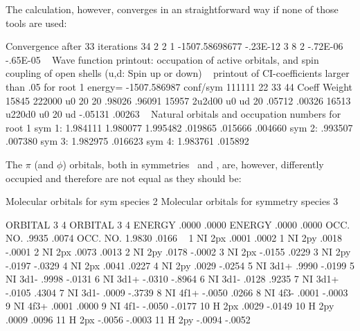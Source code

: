 The calculation, however, converges in an straightforward way if none of those tools are used:

\begin{sourcelisting}
      Convergence after  33 iterations
       34   2    2    1 -1507.58698677    -.23E-12   3   8 2  -.72E-06  -.65E-05  
~
                                  Wave function printout:
occupation of active orbitals, and spin coupling of open shells (u,d: Spin up or down)
~
      printout of CI-coefficients larger than   .05 for root   1
      energy=  -1507.586987
      conf/sym  111111 22 33 44     Coeff  Weight
         15845  222000 u0 20 20    .98026  .96091
         15957  2u2d00 u0 ud 20    .05712  .00326
         16513  u220d0 u0 20 ud   -.05131  .00263
~
      Natural orbitals and occupation numbers for root  1
      sym 1:   1.984111   1.980077   1.995482    .019865    .015666    .004660
      sym 2:    .993507    .007380
      sym 3:   1.982975    .016623
      sym 4:   1.983761    .015892
\end{sourcelisting}

The $\pi$ (and $\phi$) orbitals, both in symmetries \bo\ and \bt, are, however,
differently occupied and therefore are not equal as they should be:

\begin{sourcelisting}
   Molecular orbitals for sym species 2     Molecular orbitals for symmetry species 3

   ORBITAL        3         4               ORBITAL        3         4  
   ENERGY       .0000     .0000             ENERGY       .0000     .0000 
   OCC. NO.     .9935     .0074             OCC. NO.    1.9830     .0166
~
 1 NI  2px      .0001     .0002           1 NI  2py      .0018    -.0001 
 2 NI  2px      .0073     .0013           2 NI  2py      .0178    -.0002
 3 NI  2px     -.0155     .0229           3 NI  2py     -.0197    -.0329
 4 NI  2px      .0041     .0227           4 NI  2py      .0029    -.0254
 5 NI  3d1+     .9990    -.0199           5 NI  3d1-     .9998    -.0131
 6 NI  3d1+    -.0310    -.8964           6 NI  3d1-     .0128     .9235 
 7 NI  3d1+    -.0105     .4304           7 NI  3d1-     .0009    -.3739  
 8 NI  4f1+    -.0050     .0266           8 NI  4f3-     .0001    -.0003
 9 NI  4f3+     .0001     .0000           9 NI  4f1-    -.0050    -.0177
10 H   2px      .0029    -.0149          10 H   2py      .0009     .0096
11 H   2px     -.0056    -.0003          11 H   2py     -.0094    -.0052
\end{sourcelisting}

